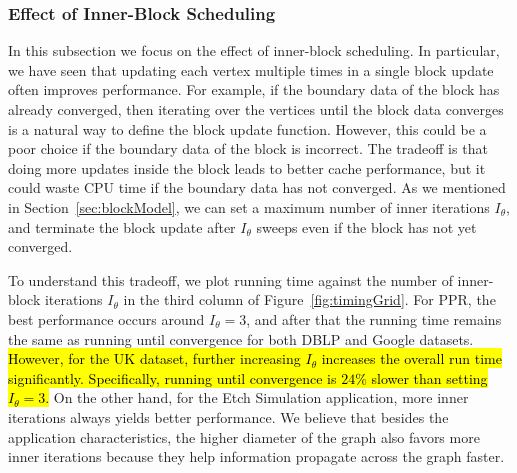 
\subsubsection{Effect of Inner-Block Scheduling}
\label{sec:ExpInnerBlock}
In this subsection we focus on the effect of inner-block
scheduling. In particular, we have seen that 
updating each vertex multiple times in a single block update
often improves performance.
%
For example, if the boundary
data of the block has already converged, then iterating over the
vertices until the block data converges is a natural way to define the
block update function.  However, 
this could be a poor choice
if the boundary data of the block is incorrect.  
The tradeoff
is that doing more updates inside the block leads to
better cache performance, but it could waste CPU time if the boundary
data has not converged.  As we mentioned in
Section~\ref{sec:blockModel}, we can set a maximum number of inner
iterations $I_{\theta}$, and terminate the block update after
$I_{\theta}$ sweeps even if the block has not yet converged.

To understand this tradeoff, we plot running time against the number
of inner-block iterations $I_{\theta}$ in
the third column of Figure~\ref{fig:timingGrid}.  For PPR, the best
performance occurs around $I_{\theta} = 3$, and after that the running
time remains the same as running until convergence for both DBLP and Google datasets.
\hl{However, for the UK dataset, further increasing $I_{\theta}$ 
increases the overall run
time significantly. Specifically, running until convergence
is $24\%$ slower than setting $I_{\theta}=3$. }
On the other hand, for the Etch Simulation application, more inner iterations
always yields better performance.  We believe that besides the
application characteristics, the higher diameter of the graph also
favors more inner iterations because they help information propagate
across the graph faster.  

